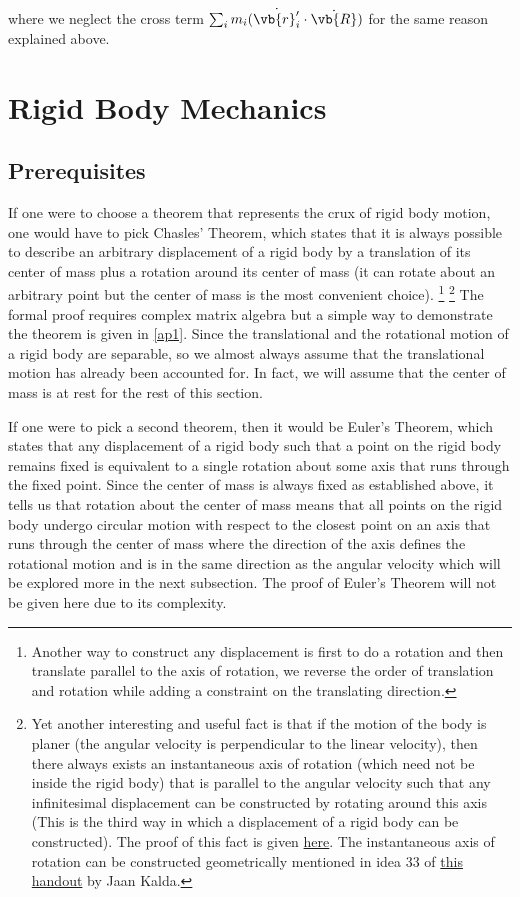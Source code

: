 \documentclass[a4paper,12pt]{report}
\begin{document}
where we neglect the cross term \(\sum_{i}^{} m_{i} (\dot{\vb{r} '_{i} } \cdot \dot{\vb{R} })  \) for the same reason explained above. 




\newpage
\section{Rigid Body Mechanics}
\subsection{Prerequisites}
If one were to choose a theorem that represents the crux of rigid body motion, one would have to pick Chasles' Theorem, which states that it is always possible to describe an arbitrary displacement of a rigid body by a translation of its center of mass plus a rotation around its center of mass (it can rotate about an arbitrary point but the center of mass is the most convenient choice). \footnote{Another way to construct any displacement is first to do a rotation and then translate parallel to the axis of rotation, we reverse the order of translation and rotation while adding a constraint on the translating direction.} \footnote{Yet another interesting and useful fact is that if the motion of the body is planer (\ie the angular velocity is perpendicular to the linear velocity), then there always exists an instantaneous axis of rotation (which need not be inside the rigid body) that is parallel to the angular velocity such that any infinitesimal displacement can be constructed by rotating around this axis (This is the third way in which a displacement of a rigid body can be constructed). The proof of this fact is given \href{https://physics.stackexchange.com/q/541554}{here}. The instantaneous axis of rotation can be constructed geometrically mentioned in idea 33 of \href{https://www.ioc.ee/~kalda/ipho/kin_ENG.pdf}{this handout} by Jaan Kalda.}  The formal proof requires complex matrix algebra but a simple way to demonstrate the theorem is given in \cref{ap1}. Since the translational and the rotational motion of a rigid body are separable, so we almost always assume that the translational motion has already been accounted for. In fact, we will assume that the center of mass is at rest for the rest of this section.

If one were to pick a second theorem, then it would be Euler's Theorem, which states that any displacement of a rigid body such that a point on the rigid body remains fixed is equivalent to a single rotation about some axis that runs through the fixed point. Since the center of mass is always fixed as established above, it tells us that rotation about the center of mass means that all points on the rigid body undergo circular motion with respect to the closest point on an axis that runs through the center of mass where the direction of the axis defines the rotational motion and is in the same direction as the angular velocity which will be explored more in the next subsection. The proof of Euler's Theorem will not be given here due to its complexity.
\end{document}
